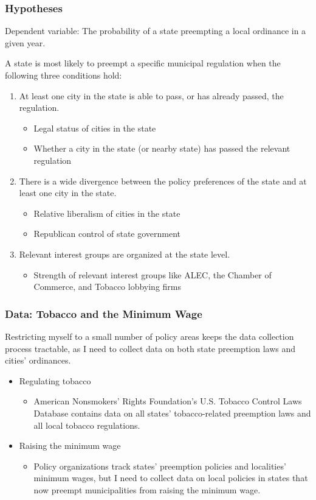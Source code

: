 \documentclass{beamer}
\begin{document}
\begin{frame}
\frametitle{Hypotheses}
Dependent variable: The probability of a state preempting a local ordinance in a given year. 

A state is most likely to preempt a specific municipal regulation when the following three conditions hold:
\begin{enumerate}
	\item At least one city in the state is able to pass, or has already passed, the regulation.
	\begin{itemize}
		\item Legal status of cities in the state 
		\item Whether a city in the state (or nearby state) has passed the relevant regulation 
	\end{itemize}
	\item There is a wide divergence between the policy preferences of the state and at least one city in the state.
	\begin{itemize}
		\item Relative liberalism of cities in the state
		\item Republican control of state government
	\end{itemize}
	\item Relevant interest groups are organized at the state level.
	\begin{itemize}
		\item Strength of relevant interest groups like ALEC, the Chamber of Commerce, and Tobacco lobbying firms
	\end{itemize}
\end{enumerate}
\end{frame}

\begin{frame}
\frametitle{Data: Tobacco and the Minimum Wage}
Restricting myself to a small number of policy areas keeps the data collection process tractable, as I need to collect data on both state preemption laws and cities' ordinances.
\begin{itemize}
	\item Regulating tobacco
	\begin{itemize}
		\item American Nonsmokers' Rights Foundation's U.S. Tobacco Control Laws Database contains data on all states' tobacco-related preemption laws and all local tobacco regulations. 
	\end{itemize}
	\item Raising the minimum wage
	\begin{itemize}
		\item Policy organizations track states' preemption policies and localities' minimum wages, but I need to collect data on local policies in states that now preempt municipalities from raising the minimum wage. 
	\end{itemize}
\end{itemize}
\end{frame}
\end{document}
